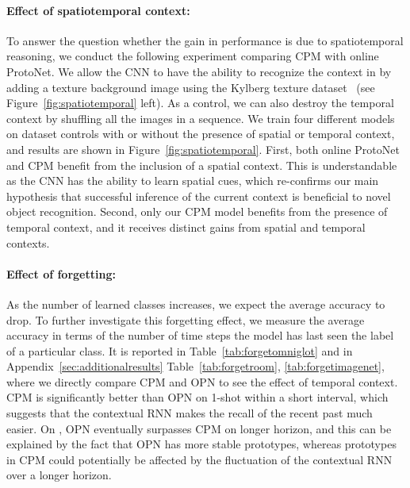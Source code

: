 \vspace{-0.1in}
\paragraph{Effect of spatiotemporal context:} To answer the question whether the gain in performance
is due to spatiotemporal reasoning, we conduct the following experiment comparing CPM with online
ProtoNet. We allow the CNN to have the ability to recognize the context in \ourchar{} by adding a
texture background image using the Kylberg texture dataset~\citep{uppsala} (see
Figure~\ref{fig:spatiotemporal} left). As a control, we can also destroy the temporal context by
shuffling all the images in a sequence. We train four different models on dataset controls with or
without the presence of spatial or temporal context, and results are shown in
Figure~\ref{fig:spatiotemporal}. First, both online ProtoNet and CPM benefit from the inclusion of a
spatial context. This is understandable as the CNN has the ability to learn spatial cues, which
re-confirms our  main hypothesis that successful inference of the current context is beneficial to
novel object recognition. Second, only our CPM model benefits from the presence of temporal context,
and it receives distinct gains from spatial and temporal contexts.

\vspace{-0.1in}
\paragraph{Effect of forgetting:} As the number of learned classes increases, we expect the average accuracy to drop. To further investigate this forgetting effect, we measure the average accuracy in terms of the number of time steps the model has last seen the label of a particular class. It is reported in Table~\ref{tab:forgetomniglot} and in Appendix~\ref{sec:additionalresults} Table~\ref{tab:forgetroom}, \ref{tab:forgetimagenet}, where we directly compare CPM and OPN to see the effect of temporal context.
CPM is significantly better than OPN on 1-shot within a short interval, which suggests that the contextual RNN 
makes the recall of the recent past much easier. On \ourimg{}, OPN eventually surpasses CPM on longer horizon, and this can be explained by the fact that OPN has more stable prototypes, whereas prototypes in CPM could potentially be affected by the fluctuation of the contextual RNN over a longer horizon.

\vspace{-0.1in}
